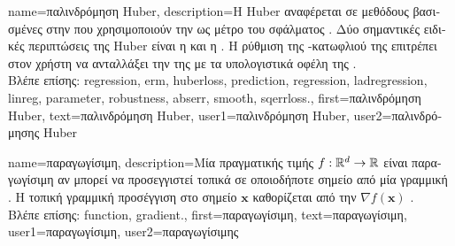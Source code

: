 {name={\foreignlanguage{greek}{παλινδρόμηση} Huber},
	description={\foreignlanguage{greek}{Η}  Huber 
		\foreignlanguage{greek}{αναφέρεται σε μεθόδους βασισμένες στην}  
		\foreignlanguage{greek}{που χρησιμοποιούν την}  \foreignlanguage{greek}{ως μέτρο του σφάλματος} 
		. \foreignlanguage{greek}{Δύο σημαντικές ειδικές περιπτώσεις της}  Huber 
		\foreignlanguage{greek}{είναι η}  \foreignlanguage{greek}{και η} . 
		\foreignlanguage{greek}{Η ρύθμιση της} -\foreignlanguage{greek}{κατωφλιού 
		της}  \foreignlanguage{greek}{επιτρέπει στον χρήστη να ανταλλάξει την}  
		\foreignlanguage{greek}{της}  
		\foreignlanguage{greek}{με τα υπολογιστικά οφέλη της}  .\\
		\foreignlanguage{greek}{Βλέπε επίσης:} \gls{regression}, \gls{erm}, \gls{huberloss}, \gls{prediction}, \gls{regression}, \gls{ladregression}, 
		\gls{linreg}, \gls{parameter}, \gls{robustness}, \gls{abserr}, \gls{smooth}, \gls{sqerrloss}.},
	first={\foreignlanguage{greek}{παλινδρόμηση} Huber},
	text={\foreignlanguage{greek}{παλινδρόμηση} Huber},
	user1={\foreignlanguage{greek}{παλινδρόμηση} Huber}, %
	user2={\foreignlanguage{greek}{παλινδρόμησης} Huber} %
}

{name={\foreignlanguage{greek}{παραγωγίσιμη}},
	description={\foreignlanguage{greek}{Μία}  \foreignlanguage{greek}{πραγματικής 
		τιμής} $f: \mathbb{R}^{d} \rightarrow \mathbb{R}$ 
		\foreignlanguage{greek}{είναι παραγωγίσιμη αν μπορεί να προσεγγιστεί τοπικά σε οποιοδήποτε σημείο από μία  
		γραμμική} . \foreignlanguage{greek}{Η τοπική γραμμική προσέγγιση στο σημείο $\mathbf{x}$ καθορίζεται
		από την}  $\nabla f ( \mathbf{x})$ \cite{RudinBookPrinciplesMatheAnalysis}.\\
		\foreignlanguage{greek}{Βλέπε επίσης:} \gls{function}, \gls{gradient}.},
	first={\foreignlanguage{greek}{παραγωγίσιμη}},
	text={\foreignlanguage{greek}{παραγωγίσιμη}},
	user1={\foreignlanguage{greek}{παραγωγίσιμη}}, %
  	user2={\foreignlanguage{greek}{παραγωγίσιμης}} %
}

